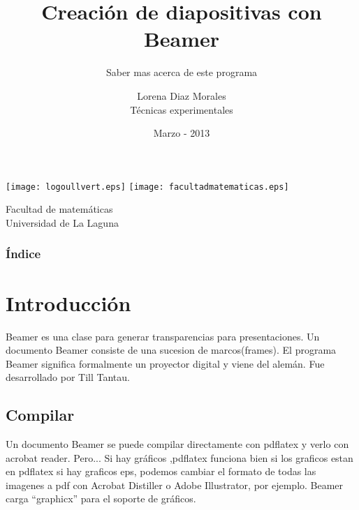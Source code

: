 \documentclass{beamer}
\title[swarm intelligente]{Creación de diapositivas con Beamer}
\subtitle{Saber mas acerca de este programa}
\author{Lorena Diaz Morales \\ Técnicas experimentales}
\date[15-03-2013]{Marzo - 2013}
\begin{document}
\begin{frame}
 \texttt{[image: logoullvert.eps]}
 \texttt{[image: facultadmatematicas.eps]}
 \titlepage
 
 \scriptsize
 \begin{center}
  Facultad de matemáticas \\
  Universidad de La Laguna \\
 \end{center}

 \end{frame}

\begin{frame}
 \frametitle{Índice}
 \tableofcontents
 \end{frame}
 
\section{Introducción} 
Beamer es una clase \latex para generar transparencias para presentaciones.
Un documento Beamer consiste de una sucesion de marcos(frames).
El programa Beamer significa formalmente un proyector digital y viene del alemán.
Fue desarrollado por Till Tantau.
\subsection{Compilar}
Un documento Beamer se puede compilar directamente con pdflatex y verlo
con acrobat reader. Pero...
Si hay gráficos ,pdflatex funciona bien si los graficos estan en pdflatex
si hay graficos eps, podemos cambiar el formato de todas las imagenes a pdf con 
Acrobat Distiller o Adobe Illustrator, por ejemplo.
Beamer carga ``graphicx'' para el soporte de gráficos.
\end{document}
